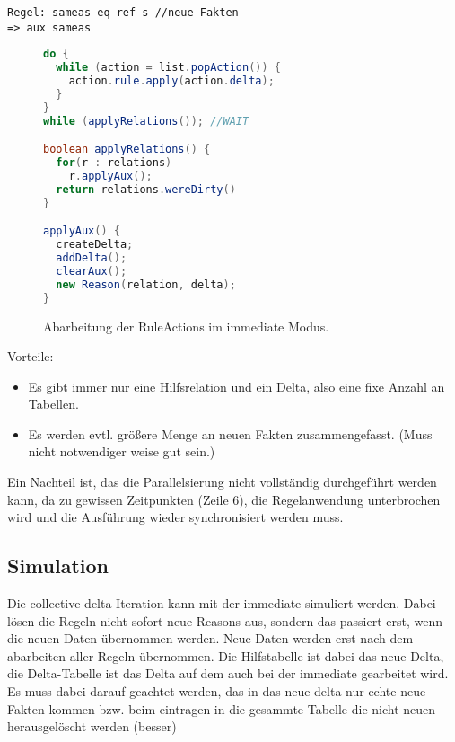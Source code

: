 \begin{verbatim}
Regel: sameas-eq-ref-s //neue Fakten
=> aux sameas
\end{verbatim}

\begin{figure}[htp]
	\caption{Abarbeitung der RuleActions im immediate Modus.}
	\label{code-immediate-delta-iteration}
	\begin{lstlisting}[language=Java]
do {
  while (action = list.popAction()) {
    action.rule.apply(action.delta);
  }
}
while (applyRelations()); //WAIT

boolean applyRelations() {
  for(r : relations)
    r.applyAux();
  return relations.wereDirty()
}

applyAux() {
  createDelta;
  addDelta();
  clearAux();
  new Reason(relation, delta);
}
	\end{lstlisting}
\end{figure}

Vorteile:
\begin{itemize}
  \item Es gibt immer nur eine Hilfsrelation und ein Delta, also eine fixe Anzahl an Tabellen.
  \item Es werden evtl. größere Menge an neuen Fakten zusammengefasst. (Muss nicht notwendiger weise gut sein.)
\end{itemize}

Ein Nachteil ist, das die Parallelsierung nicht vollständig durchgeführt werden kann, da zu gewissen Zeitpunkten (Zeile 6), die Regelanwendung unterbrochen wird und die Ausführung wieder synchronisiert werden muss.

\subsection{Simulation}

Die collective delta-Iteration kann mit der immediate simuliert werden. Dabei lösen die Regeln nicht sofort neue Reasons aus, sondern das passiert erst, wenn die neuen Daten übernommen werden. Neue Daten werden erst nach dem abarbeiten aller Regeln übernommen. Die Hilfstabelle ist dabei das neue Delta, die Delta-Tabelle ist das Delta auf dem auch bei der immediate gearbeitet wird. Es muss dabei darauf geachtet werden, das in das neue delta nur echte neue Fakten kommen bzw. beim eintragen in die gesammte Tabelle die nicht neuen herausgelöscht werden (besser)

